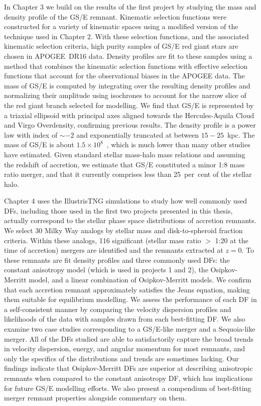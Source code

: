 In Chapter 3 we build on the results of the first project by studying the mass and density profile of the GS/E remnant. Kinematic selection functions were constructed for a variety of kinematic spaces using a modified version of the technique used in Chapter 2. With these selection functions, and the associated kinematic selection criteria, high purity samples of GS/E red giant stars are chosen in APOGEE~DR16 data. Density profiles are fit to these samples using a method that combines the kinematic selection functions with effective selection functions that account for the observational biases in the APOGEE data. The mass of GS/E is computed by integrating over the resulting density profiles and normalizing their amplitude using isochrones to account for the narrow slice of the red giant branch selected for modelling. We find that GS/E is represented by a triaxial ellipsoid with principal axes aligned towards the Hercules-Aquila Cloud and Virgo Overdensity, confirming previous results. The density profile is a power law with index of $\sim -2$ and exponentially truncated at between $15-25$~kpc. The mass of GS/E is about $1.5\times10^{8}$~\Msun, which is much lower than many other studies have estimated. Given standard stellar mass-halo mass relations and assuming the redshift of accretion, we estimate that GS/E constituted a minor 1:8 mass ratio merger, and that it currently comprises less than 25~per~cent of the stellar halo.

Chapter 4 uses the IllustrisTNG simulations to study how well commonly used DFs, including those used in the first two projects presented in this thesis, actually correspond to the stellar phase space distributions of accretion remnants. We select 30 Milky Way analogs by stellar mass and disk-to-spheroid fraction criteria. Within these analogs, 116 significant (stellar mass ratio $>$ 1:20 at the time of accretion) mergers are identified and the remnants extracted at $z=0$. To these remnants are fit density profiles and three commonly used DFs: the constant anisotropy model (which is used in projects 1 and 2), the Osipkov-Merritt model, and a linear combination of Osipkov-Merritt models. We confirm that each accretion remnant approximately satisfies the Jeans equation, making them suitable for equilibrium modelling. We assess the performance of each DF in a self-consistent manner by comparing the velocity dispersion profiles and likelihoods of the data with samples drawn from each best-fitting DF. We also examine two case studies corresponding to a GS/E-like merger and a Sequoia-like merger. All of the DFs studied are able to satisfactorily capture the broad trends in velocity dispersion, energy, and angular momentum for most remnants, and only the specifics of the distributions and trends are sometimes lacking. Our findings indicate that Osipkov-Merritt DFs are superior at describing anisotropic remnants when compared to the constant anisotropy DF, which has implications for future GS/E modelling efforts. We also present a compendium of best-fitting merger remnant properties alongside commentary on them.